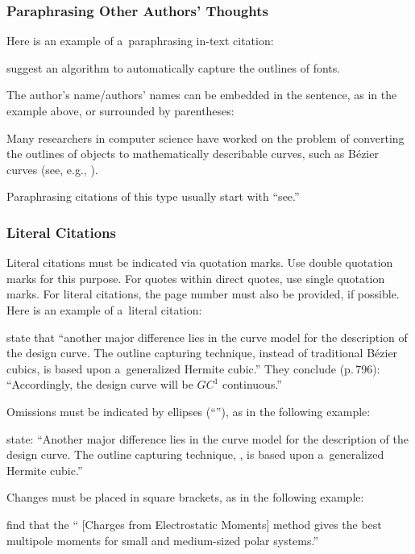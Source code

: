 \subsubsection{Paraphrasing Other Authors' Thoughts}

Here is an example of a~paraphrasing in-text citation:
\begin{longtblr}{}
	\cite{sarfraz} suggest an algorithm to automatically capture the outlines of fonts.
\end{longtblr}
\noindent The author's name/authors' names can be embedded in the sentence, as in the example above, or surrounded by parentheses:
\begin{longtblr}{}
	Many researchers in computer science have worked on the problem of converting the outlines of objects to mathematically describable curves, such as B\'{e}zier curves (see, e.g., \citealp{sarfraz}).
\end{longtblr}
\noindent Paraphrasing citations of this type usually start with ``see.''

\subsubsection{Literal Citations}

Literal citations must be indicated via quotation marks. Use double quotation marks for this purpose. For quotes within direct quotes, use single quotation marks. For literal citations, the page number must also be provided, if possible. Here is an example of a~literal citation:
\begin{longtblr}{}
	\cite[795]{sarfraz} state that ``another major difference lies in the curve model for the description of the design curve. The outline capturing technique, instead of traditional B\'{e}zier cubics, is based upon a~generalized Hermite cubic.'' They conclude (p.\,796): ``Accordingly, the design curve will be $GC^1$ continuous.''
\end{longtblr}

Omissions must be indicated by ellipses (``\textellipsis\!''), as in the following example:
\begin{longtblr}{}
	\cite[795]{sarfraz} state: ``Another major difference lies in the curve model for the description of the design curve. The outline capturing technique, \textellipsis, is based upon a~generalized Hermite cubic.''
\end{longtblr}

Changes must be placed in square brackets, as in the following example:
\begin{longtblr}{}
	\cite[377]{sigfridsson} find that the `` [Charges from Electrostatic Moments] method gives the best multipole moments for small and medium-sized polar systems.''
\end{longtblr}

